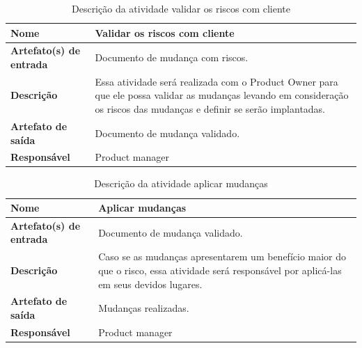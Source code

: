     \begin{table}[H]
        \centering
        \label{descricaoAtividades27}
        \caption{Descrição da atividade validar os riscos com cliente}
            \begin{tabular}{|l|p{10cm}|}
            \hline
            \textbf{Nome} & Validar os riscos com cliente \\
            \hline
            \textbf{Artefato(s) de entrada} & Documento de mudança com riscos. \\
            \hline
            \textbf{Descrição} & Essa atividade será realizada com o Product Owner para que ele possa validar as mudanças levando em consideração os riscos das mudanças e definir se serão implantadas. \\
            \hline
            \textbf{Artefato de saída} & Documento de mudança validado. \\
            \hline
            \textbf{Responsável} & Product manager \\
            \hline
        \end{tabular}
    \end{table}

    \begin{table}[H]
        \centering
        \label{descricaoAtividades28}
    \caption{Descrição da atividade aplicar mudanças}
        \begin{tabular}{|l|p{10cm}|}
        \hline
        \textbf{Nome} & Aplicar mudanças \\
        \hline
        \textbf{Artefato(s) de entrada} & Documento de mudança validado. \\
        \hline
        \textbf{Descrição} & Caso se as mudanças apresentarem um benefício maior do que o risco, essa atividade será responsável por aplicá-las em seus devidos lugares. \\
        \hline
        \textbf{Artefato de saída} & Mudanças realizadas. \\
        \hline
        \textbf{Responsável} & Product manager \\
        \hline
    \end{tabular}
\end{table}


